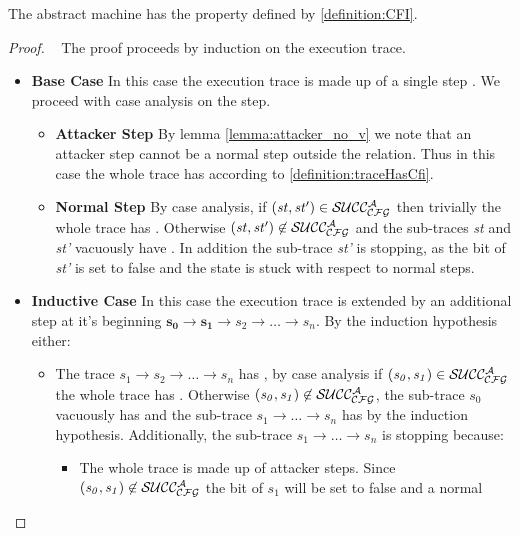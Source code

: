 \begin{thm}\label{thm:CFIabstract}
The abstract machine has the \CFI property defined by \ref{definition:CFI}.
\end{thm}

\begin{proof} 
  ~ The proof proceeds by induction on the execution trace.
  \begin{itemize}
  \item \textbf{Base Case} In this case the execution trace is made up
    of a single step . We proceed with case analysis on
    the step.
    \begin{itemize}
    \item \textbf{Attacker Step} By lemma \ref{lemma:attacker_no_v} we
      note that an attacker step cannot be a normal step outside the
       relation. Thus in this case the whole trace has \CFI
      according to \ref{definition:traceHasCfi}.
    \item \textbf{Normal Step} By case analysis, if
      $(\mathit{st},\mathit{st'}) \in \mathcal{SUCC_\mathcal{CFG}^{A}}$ then trivially the
      whole trace has \CFI. Otherwise $(\mathit{st},\mathit{st'}) \not
      \in \mathcal{SUCC_\mathcal{CFG}^{A}}$ and the sub-traces \textit{st} and \textit{st'}
      vacuously have \CFI. In addition the sub-trace \textit{st'} is
      stopping, as the \ok bit of \textit{st'} is set to false and the
      state is stuck with respect to normal steps.
    \end{itemize}
  \item \textbf{Inductive Case} In this case the execution trace is
    extended by an additional step at it's beginning
    $\mathbf{s_0 \to s_1} \to s_2 \to \ldots \to s_n$. 
    By the induction hypothesis either:
    \begin{itemize}
    \item The trace $s_1 \to s_2 \to \ldots \to s_n$ has \CFI, by case
      analysis if $(\mathit{s_0},\mathit{s_1}) \in \mathcal{SUCC_\mathcal{CFG}^{A}}$ the
      whole trace has \CFI. Otherwise $(\mathit{s_0},\mathit{s_1})
      \not \in \mathcal{SUCC_\mathcal{CFG}^{A}}$, the sub-trace $s_0$ vacuously has \CFI and
      the sub-trace $s_1 \to \ldots \to s_n$ has \CFI by the induction
      hypothesis. Additionally, the sub-trace $s_1 \to \ldots \to s_n$
      is stopping because:
      \begin{itemize}
        \item The whole trace is made up of attacker steps.
           Since $(\mathit{s_0},\mathit{s_1}) \not \in \mathcal{SUCC_\mathcal{CFG}^{A}}$
           the \ok bit of $s_1$ will be set to false and a normal

\end{itemize}
\end{itemize}
\end{itemize}
\end{proof}
